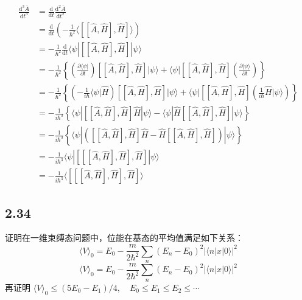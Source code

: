 \begin{equation}
    \begin{aligned}
        \frac{\mathrm{d}^3\bar{A}}{\mathrm{d}t^3}&=\frac{\mathrm{d}}{\mathrm{d}t}\frac{\mathrm{d}^2\bar{A}}{\mathrm{d}t^2}
\\
&=\frac{\mathrm{d}}{\mathrm{d}t}\left( -\frac{1}{\hbar ^2}\langle [[\hat{A},\hat{H}],\hat{H}]\rangle \right) 
\\
&=-\frac{1}{\hbar ^2}\frac{\mathrm{d}}{\mathrm{d}t}\langle \psi |[[\hat{A},\hat{H}],\hat{H}]|\psi \rangle 
\\
&=-\frac{1}{\hbar ^2}\left\{ \left( \frac{\partial \langle \psi |}{\partial t} \right) [[\hat{A},\hat{H}],\hat{H}]|\psi \rangle +\langle \psi |[[\hat{A},\hat{H}],\hat{H}]\left( \frac{\partial |\psi \rangle}{\partial t} \right) \right\} 
\\
&=-\frac{1}{\hbar ^2}\left\{ \left( -\frac{1}{i\hbar}\langle \psi |\hat{H} \right) [[\hat{A},\hat{H}],\hat{H}]|\psi \rangle +\langle \psi |[[\hat{A},\hat{H}],\hat{H}]\left( \frac{1}{i\hbar}\hat{H}|\psi \rangle \right) \right\} 
\\
&=-\frac{1}{i\hbar ^3}\left\{ \langle \psi |[[\hat{A},\hat{H}],\hat{H}]\hat{H}|\psi \rangle -\langle \psi |\hat{H}[[\hat{A},\hat{H}],\hat{H}]|\psi \rangle \right\} 
\\
&=-\frac{1}{i\hbar ^3}\left\{ \langle \psi |\left( [[\hat{A},\hat{H}],\hat{H}]\hat{H}-\hat{H}[[\hat{A},\hat{H}],\hat{H}] \right) |\psi \rangle \right\} 
\\
&=-\frac{1}{i\hbar ^3}\langle \psi |[[[\hat{A},\hat{H}],\hat{H}],\hat{H}]|\psi \rangle 
\\
&=-\frac{1}{i\hbar ^3}\langle [[[\hat{A},\hat{H}],\hat{H}],\hat{H}]\rangle 
    \end{aligned}
\end{equation}

\newpage
\subsection{2.34}
证明在一维束缚态问题中，位能在基态的平均值满足如下关系：
$$\langle V \rangle_0 = E_0 - \frac{m}{2\hbar^2} \sum_n (E_n - E_0)^2 |\langle n| x | 0 \rangle|^2$$
$$\langle V\rangle _0=E_0-\frac{m}{2\hbar ^2}\sum_n{\left( E_n-E_0 \right) ^2\left| \langle n|x|0\rangle \right|^2}$$
再证明 $\langle V \rangle_0 \leq (5E_0 - E_1)/4, \quad E_0 \leq E_1 \leq E_2 \leq \cdots$

